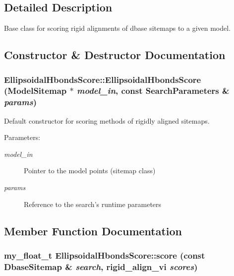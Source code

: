 \subsection{Detailed Description}
Base class for scoring rigid alignments of dbase sitemaps to a given model. 



\subsection{Constructor \& Destructor Documentation}
\subsubsection{\setlength{\rightskip}{0pt plus 5cm}Ellipsoidal\-Hbonds\-Score::Ellipsoidal\-Hbonds\-Score (\bf{Model\-Sitemap} $\ast$ {\em model\_\-in}, const \bf{Search\-Parameters} \& {\em params})}\label{classASCbase_1_1EllipsoidalHbondsScore_bc22221f61f9d49046c70d382c09100a}


Default constructor for scoring methods of rigidly aligned sitemaps. 

\begin{Desc}
\item[Parameters:]
\begin{description}
\item[{\em model\_\-in}]Pointer to the model points (sitemap class) \item[{\em params}]Reference to the search's runtime parameters \end{description}
\end{Desc}


\subsection{Member Function Documentation}
\subsubsection{\setlength{\rightskip}{0pt plus 5cm}my\_\-float\_\-t Ellipsoidal\-Hbonds\-Score::score (const \bf{Dbase\-Sitemap} \& {\em search}, rigid\_\-align\_\-vi {\em scores})\hspace{0.3cm}{\tt  [protected]}}\label{classASCbase_1_1EllipsoidalHbondsScore_d2d7d3b19e1996210beea00d80ca7ec8}


